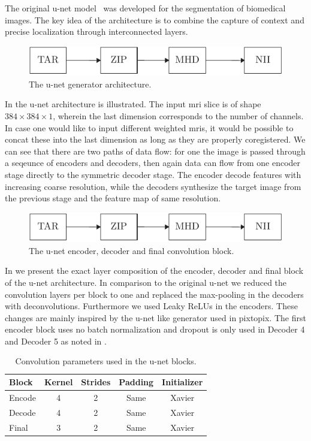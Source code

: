 The original u-net model~\cite{Ronneberger15} was developed for the
segmentation of biomedical images. The key idea of the architecture is to
combine the capture of context and precise localization through interconnected
layers.
\begin{figure}[h]
  \centering
  \includegraphics[page=3,width=\linewidth]{figure/diagrams.pdf}
  \caption{The u-net generator architecture.
  }\label{fig:unet:gen}
\end{figure}
In  the u-net architecture is illustrated. The
input \gls{mri} slice is of shape $384\times384\times1$, wherein the last
dimension corresponds to the number of channels. In case one would like to
input different weighted \gls{mri}s, it would be possible to concat these into
the last dimension as long as they are properly coregistered.
We can see that there are two paths of data flow: for one the image is passed
through a seqeunce of encoders and decoders, then again data can flow from
one encoder stage directly to the symmetric decoder stage. The encoder decode
features with increasing coarse resolution, while the decoders synthesize the
target image from the previous stage and the feature map of same resolution.
\begin{figure}[h]
  \centering
  \includegraphics[page=4,width=\linewidth]{figure/diagrams.pdf}
  \caption{The u-net encoder, decoder and final convolution block.
	}\label{fig:unet:blocks}
\end{figure}
In  we present the exact layer composition of the
encoder, decoder and final block of the u-net architecture. In comparison to
the original u-net we reduced the convolution layers per block to one and
replaced the max-pooling in the decoders with deconvolutions. Furthermore
we used Leaky ReLUs in the encoders. These changes are mainly inspired by the
u-net like generator used in pixtopix. The first encoder block uses no batch
normalization and dropout is only used in Decoder \num{4} and Decoder \num{5}
as noted in .
\begin{table}[h]
  \centering
  \begin{tabular}{lcccc}
    \toprule
    Block & Kernel & Strides & Padding & Initializer \\
    \midrule
    Encode & \num{4} & \num{2} & Same & Xavier \\
    Decode & \num{4} & \num{2} & Same & Xavier \\
    Final  & \num{3} & \num{2} & Same & Xavier \\
    \bottomrule
  \end{tabular}
  \caption{Convolution parameters used in the u-net blocks.
  }\label{tab:unet:conv}
\end{table}
